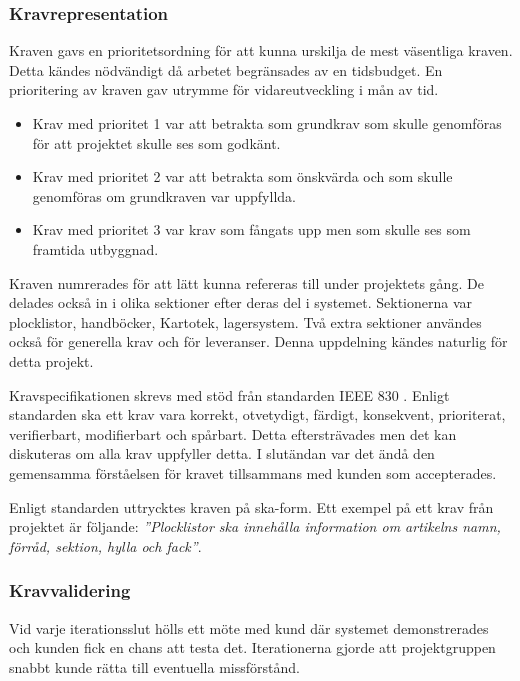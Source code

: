 \documentclass{article}
\begin{document}
\subsubsection{Kravrepresentation}
Kraven gavs en prioritetsordning för att kunna urskilja de mest väsentliga kraven. Detta kändes nödvändigt då arbetet begränsades av en tidsbudget. En prioritering av kraven gav utrymme för vidareutveckling i mån av tid.
\begin{itemize}
\item Krav med prioritet 1 var att betrakta som grundkrav som skulle genomföras för att projektet skulle ses som godkänt.
\item Krav med prioritet 2 var att betrakta som önskvärda och som skulle genomföras om grundkraven var uppfyllda.
\item Krav med prioritet 3 var krav som fångats upp men som skulle ses som framtida utbyggnad. 
\end{itemize}  

Kraven numrerades för att lätt kunna refereras till under projektets gång. De delades också in i olika sektioner efter deras del i systemet. Sektionerna var plocklistor, handböcker, Kartotek, lagersystem. Två extra sektioner användes också för generella krav och för leveranser. Denna uppdelning kändes naturlig för detta projekt. 

Kravspecifikationen skrevs med stöd från standarden IEEE 830 \cite{ieee830}. Enligt standarden ska ett krav vara korrekt, otvetydigt, färdigt, konsekvent, prioriterat, verifierbart, modifierbart och spårbart. Detta eftersträvades men det kan diskuteras om alla krav uppfyller detta. I slutändan var det ändå den gemensamma förståelsen för kravet tillsammans med kunden som accepterades. 

Enligt standarden uttrycktes kraven på ska-form. Ett exempel på ett krav från projektet är följande: \textit{''Plocklistor ska innehålla information om artikelns namn, förråd, sektion, hylla och fack''}.

\subsubsection{Kravvalidering}
Vid varje iterationsslut hölls ett möte med kund där systemet demonstrerades och kunden fick en chans att testa det. Iterationerna gjorde att projektgruppen snabbt kunde rätta till eventuella missförstånd. 
\end{document}
